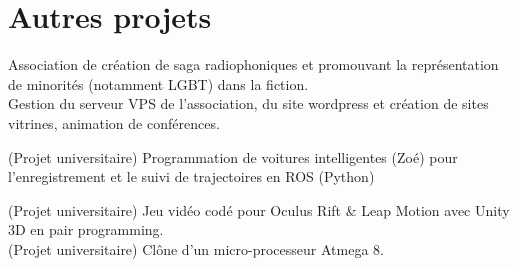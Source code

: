 \documentclass[]{cv-template}
\begin{document}
\begin{minipage}[t]{0.65\textwidth}



\section{Autres projets}
Association de création de saga radiophoniques et promouvant la représentation de minorités (notamment LGBT) dans la fiction.\\
Gestion du serveur VPS de l'association, du site wordpress et création de sites vitrines, animation de conférences.

(Projet universitaire) Programmation de voitures intelligentes (Zoé) pour l'enregistrement et le suivi de trajectoires en ROS (Python)


(Projet universitaire) Jeu vidéo codé pour Oculus Rift \& Leap Motion avec Unity 3D en pair programming. \\

(Projet universitaire) Clône d'un micro-processeur Atmega 8.


\end{minipage}
\end{document}
